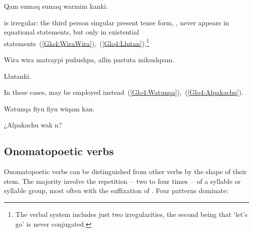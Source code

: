 %
{Qam sumaq sumaq warmim kanki.}%
{}%
{}{}%

\noindent
{} is irregular: the third person singular present tense form, , never appears in equational statements, but only in existential statements~(\ref{Glo4:WiraWira}),~(\ref{Glo4:Llutan}).\footnote{The verbal system includes just two irregularities, the second being that  ‘let’s go’ is never conjugated.}

%
{Wira wira matraypi puñushpa, allin pastuta mikushpam.}%
{}%
{}{}%

%
{Llutanki.}%
{}%
{}{}%

\noindent
In these cases,  may be employed instead~(\ref{Glo4:Watunqa}),~(\ref{Glo4:Alpakachu}).

%
{Watunqa fiyu fiyu wiqam kan.}%
{}%
{}{}%

%
{¿Alpakachu wak n?}%
{}%
{}{}%

\subsection{Onomatopoetic verbs}\label{sec:onomatopoeicverbs}
Onomatopoetic verbs can be distinguished from other verbs by the shape of their stem. The majority involve the repetition --~two to four times~-- of a syllable or syllable group, most often with the suffixation of . Four patterns dominate:

